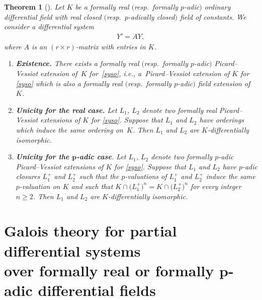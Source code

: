 \documentclass[pdftex]{sigma}%
\numberwithin{equation}{section}
\newtheorem{Theorem}{Theorem}[section]
\begin{document}
\begin{Theorem}[{\cite[Theorem~2]{CHP}}] \label{CHP}
Let $K$ be a formally real $($resp.\ formally $p$-adic$)$ ordinary differential field with real closed $($resp.\ $p$-adically closed$)$ field of constants. We consider a differential system
\begin{gather}\label{syso}
Y'=A Y,
\end{gather}
where $A$ is an $(r \times r)$-matrix with entries in $K$.
\begin{enumerate}\itemsep=0pt
\item[$1.$] {\bf \emph{Existence}.} There exists a formally real $($resp.\ formally $p$-adic$)$ Picard--Vessiot extension of~$K$ for~\eqref{syso}, i.e., a~Picard--Vessiot extension of $K$ for \eqref{syso} which is also a formally real $($resp.\ formally $p$-adic$)$ field extension of~$K$.
\item[$2.$] {\bf \emph{Unicity for the real case}.} Let $L_1$, $L_2$ denote two formally real Picard--Vessiot extensions of $K$ for \eqref{syso}. Suppose that $L_1$ and $L_2$ have orderings which induce the same ordering on~$K$. Then $L_1$ and $L_2$ are $K$-differentially isomorphic.
\item[$3.$] {\bf \emph{Unicity for the} $\boldsymbol p$-\emph{adic case}}. Let $L_1$, $L_2$ denote two formally $p$-adic
Picard--Vessiot extensions of $K$ for \eqref{syso}. Suppose that $L_1$ and $L_2$
have $p$-adic closures $L_1^+$ and $L_2^+$ such that the
$p$-valuations of $L_1^+$ and $L_2^+$ induce the same
$p$-valuation
on $K$ and such that $K\cap \big(L_1^+\big)^n=K\cap \big(L_2^+\big)^n$ for every integer $n\geq 2$. Then $L_1$ and $L_2$ are $K$-differentially isomorphic.
\end{enumerate}
\end{Theorem}

\section[Galois theory for partial differential systems over formally real or formally p-adic differential fields]
{Galois theory for partial differential systems \\over formally real or formally $\boldsymbol p$-adic differential fields}
\end{document}
